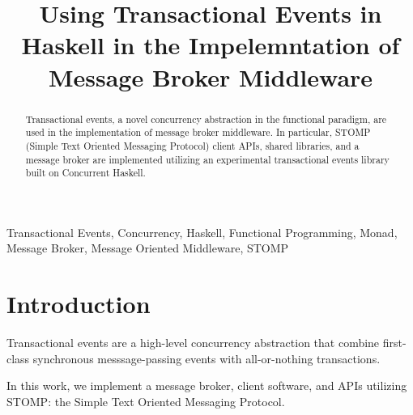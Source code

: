 \documentclass[conference, letterpaper]{IEEEtran}
\begin{document}
\title{Using Transactional Events in Haskell in the Impelemntation of Message Broker Middleware}

\author{
}

\maketitle


\begin{abstract}
Transactional events, a novel concurrency abstraction in the functional paradigm, are used in the 
implementation of message broker middleware. In particular, STOMP (Simple Text Oriented Messaging 
Protocol) client APIs, shared libraries, and a message broker are implemented utilizing an 
experimental transactional events library built on Concurrent Haskell.
\end{abstract}


\begin{IEEEkeywords}
Transactional Events, Concurrency, Haskell, Functional Programming, Monad, Message Broker, 
Message Oriented Middleware, STOMP
\end{IEEEkeywords}

\IEEEpeerreviewmaketitle

\section{Introduction}
Transactional events are a high-level concurrency abstraction that combine first-class synchronous 
messsage-passing events with all-or-nothing transactions. \cite{te:original} 

In this work, we implement a message broker, client software, and APIs utilizing STOMP: the Simple Text
 Oriented Messaging Protocol.
\cite{stomp:spec}




\end{document}
